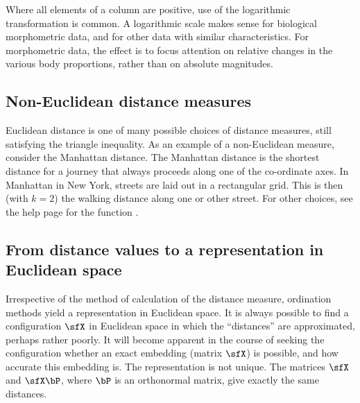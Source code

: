 Where all elements of a column are positive, use of the
logarithmic transformation is common. A logarithmic scale makes sense
for biological morphometric data, and for other data with similar
characteristics.  For morphometric data, the effect is to focus
attention on relative changes in the various body proportions,
rather than on absolute magnitudes.

\subsection*{Non-Euclidean distance measures}

Euclidean distance is one of many possible choices of distance
measures, still satisfying the triangle inequality.  As an example of
a non-Euclidean measure, consider the Manhattan distance.
The Manhattan distance is the shortest distance for a journey that
always proceeds along one of the co-ordinate axes.  In Manhattan in
New York, streets are laid out in a rectangular grid.  This is then
(with $k=2$) the walking distance along one or other street.  For
other choices, see the help page for the function
.

\subsection*{From distance values to a representation in Euclidean space}

Irrespective of the method of calculation of the distance measure,
ordination methods yield a representation in Euclidean space.  It is
always possible to find a configuration $\sfX$ in Euclidean space in
which the ``distances'' are approximated, perhaps rather
poorly.  It will become apparent in the course of seeking the
configuration whether an exact embedding (matrix $\sfX$) is possible,
and how accurate this embedding is.
The representation is not
unique.  The matrices $\sfX$ and $\sfX \bP$, where $\bP$ is an
orthonormal matrix, give exactly the same distances.


